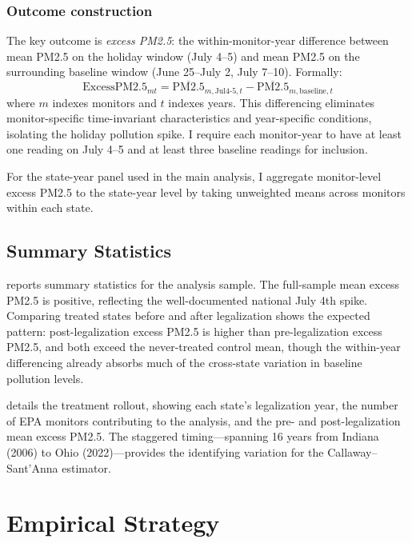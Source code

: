 \documentclass[12pt]{article}
\begin{document}
\subsubsection*{Outcome construction} The key outcome is \textit{excess PM2.5}: the within-monitor-year difference between mean PM2.5 on the holiday window (July 4--5) and mean PM2.5 on the surrounding baseline window (June 25--July 2, July 7--10). Formally:
\begin{equation}
\text{ExcessPM2.5}_{mt} = \overline{\text{PM2.5}}_{m,\text{Jul4-5},t} - \overline{\text{PM2.5}}_{m,\text{baseline},t}
\label{eq:excess}
\end{equation}
where $m$ indexes monitors and $t$ indexes years. This differencing eliminates monitor-specific time-invariant characteristics and year-specific conditions, isolating the holiday pollution spike. I require each monitor-year to have at least one reading on July 4--5 and at least three baseline readings for inclusion.

For the state-year panel used in the main analysis, I aggregate monitor-level excess PM2.5 to the state-year level by taking unweighted means across monitors within each state.

\subsection{Summary Statistics}



 reports summary statistics for the analysis sample. The full-sample mean excess PM2.5 is positive, reflecting the well-documented national July 4th spike. Comparing treated states before and after legalization shows the expected pattern: post-legalization excess PM2.5 is higher than pre-legalization excess PM2.5, and both exceed the never-treated control mean, though the within-year differencing already absorbs much of the cross-state variation in baseline pollution levels.



 details the treatment rollout, showing each state's legalization year, the number of EPA monitors contributing to the analysis, and the pre- and post-legalization mean excess PM2.5. The staggered timing---spanning 16 years from Indiana (2006) to Ohio (2022)---provides the identifying variation for the Callaway--Sant'Anna estimator.


\section{Empirical Strategy}
\end{document}
